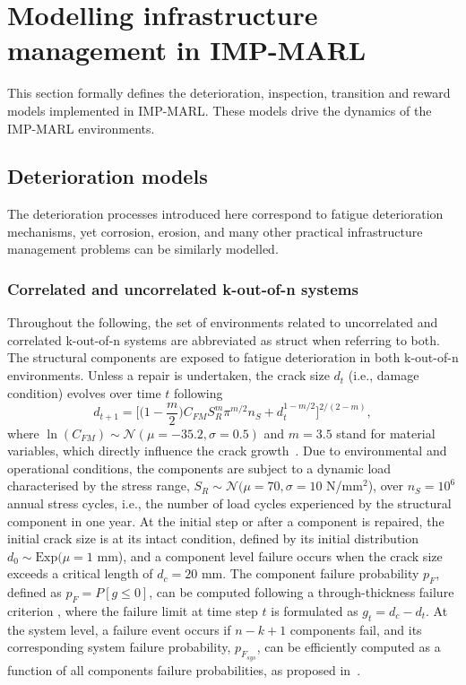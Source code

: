 \section{Modelling infrastructure management in IMP-MARL}
\label{sec:ch5_models}
This section formally defines the deterioration, inspection, transition and reward models implemented in IMP-MARL.
These models drive the dynamics of the IMP-MARL environments.

\subsection{Deterioration models}
The deterioration processes introduced here correspond to fatigue deterioration mechanisms, yet corrosion, erosion, and many other practical infrastructure management problems can be similarly modelled.

\subsubsection{Correlated and uncorrelated k-out-of-n systems}
Throughout the following, the set of environments related to uncorrelated and correlated k-out-of-n systems are abbreviated as struct when referring to both. 
The structural components are exposed to fatigue deterioration in both k-out-of-n environments.
Unless a repair is undertaken, the crack size $d_t$ (i.e., damage condition) evolves over time $t$ following
\begin{equation} \label{Eq:ExamCrackGrow}
d_{t+1} =\bigg[ \Big(1-\frac{m}{2}\Big) C_{FM}S_{R}^m\pi ^{m/2}n_{S} + d_t^{1-m/2}\bigg] ^{2/(2-m)}   ,
\end{equation}
where $\ln(C_{FM}) \sim \mathcal{N} (\mu=-35.2, \sigma=0.5)$ and $m=3.5$ stand for material variables, which directly influence the crack growth~\citep{Ditlevsen2007StructuralMethods}.
Due to environmental and operational conditions, the components are subject to a dynamic load characterised by the stress range, $S_{R}  \sim  \mathcal{N} (\mu=70, \sigma=10$ N/mm$^2$), over $n_{S}=10^6$ annual stress cycles, i.e., the number of load cycles experienced by the structural component in one year.
At the initial step or after a component is repaired, the initial crack size is at its intact condition, defined by its initial distribution $d_0  \sim  \text{Exp} (\mu=1$ mm), and a component level failure occurs when the crack size exceeds a critical length of $d_c=20$ mm. 
The component failure probability $p_{F}$, defined as $p_{F}=P[g \leq 0]$, can be computed following a through-thickness failure criterion \cite{hlaing2022inspection}, where the failure limit at time step $t$ is formulated as $g_{t}=d_c-d_t$. At the system level, a failure event occurs if $n-k+1$ components fail, and its corresponding system failure probability, $p_{F_{sys}}$, can be efficiently computed as a function of all components failure probabilities, as proposed in~\citep{barlow1984computing}. 

